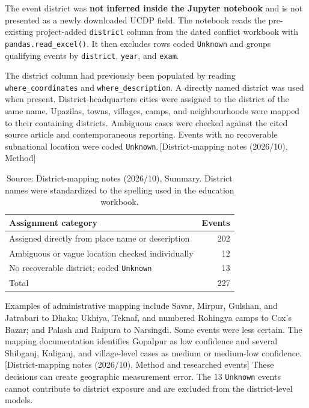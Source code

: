 \documentclass[11pt]{article}
\newcommand{\sourceref}[1]{\textcolor{black!65}{\,[#1]}}
\begin{document}
The event district was \textbf{not inferred inside the Jupyter notebook} and is not presented as a newly downloaded UCDP field. The notebook reads the pre-existing project-added \texttt{district} column from the dated conflict workbook with \texttt{pandas.read\_excel()}. It then excludes rows coded \texttt{Unknown} and groups qualifying events by \texttt{district}, \texttt{year}, and \texttt{exam}.

The district column had previously been populated by reading \texttt{where\_coordinates} and \texttt{where\_description}. A directly named district was used when present. District-headquarters cities were assigned to the district of the same name. Upazilas, towns, villages, camps, and neighbourhoods were mapped to their containing districts. Ambiguous cases were checked against the cited source article and contemporaneous reporting. Events with no recoverable subnational location were coded \texttt{Unknown}.\sourceref{District-mapping notes (2026/10), Method}

\begin{table}[H]
\centering
\caption{Provenance of event district assignments}
\label{tab:district-mapping}
\begin{tabular}{lr}
\toprule
\textbf{Assignment category} & \textbf{Events} \\
\midrule
Assigned directly from place name or description & 202 \\
Ambiguous or vague location checked individually & 12 \\
No recoverable district; coded \texttt{Unknown} & 13 \\
\midrule
Total & 227 \\
\bottomrule
\end{tabular}
\caption*{\footnotesize Source: District-mapping notes (2026/10), Summary. District names were standardized to the spelling used in the education workbook.}
\end{table}

Examples of administrative mapping include Savar, Mirpur, Gulshan, and Jatrabari to Dhaka; Ukhiya, Teknaf, and numbered Rohingya camps to Cox's Bazar; and Palash and Raipura to Narsingdi. Some events were less certain. The mapping documentation identifies Gopalpur as low confidence and several Shibganj, Kaliganj, and village-level cases as medium or medium-low confidence.\sourceref{District-mapping notes (2026/10), Method and researched events} These decisions can create geographic measurement error. The 13 \texttt{Unknown} events cannot contribute to district exposure and are excluded from the district-level models.
\end{document}

